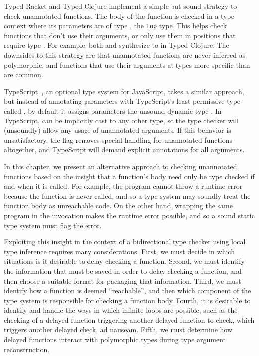 Typed Racket and Typed Clojure implement a simple but sound strategy
to check unannotated functions. The body of the function is checked
in a type context where its parameters are of type ,
the \texttt{Top} type.
This helps check functions that don't use their arguments, or only
use them in positions that require type .
For example, both  and  
synthesize to  in Typed Clojure.
The downsides to this strategy are that unannotated functions are never
inferred as polymorphic, and functions that use their arguments
at types more specific than  are common.

TypeScript~\cite{typescript}, an optional type system for JavaScript,
takes a similar approach, but instead of annotating parameters with
TypeScript's least permissive type called ,
by default it assigns parameters the unsound dynamic type .
In TypeScript,  can be implicitly cast to any other type,
so the type checker will (unsoundly) allow any usage of unannotated arguments.
If this behavior is unsatisfactory,
the  flag removes special handling for unannotated
functions altogether, and TypeScript will demand explicit annotations for all arguments.

In this chapter, we present an alternative approach to checking unannotated functions
based on the insight that a function's body need only be type checked if and when it is called.
For example, the program  cannot throw a runtime error because
the function is never called, and so a type system may soundly treat the function body as unreachable code.
On the other hand, wrapping the same program in the invocation
makes the runtime error possible, and so a sound static type system must flag the error.

Exploiting this insight in the context of a bidirectional type checker using
local type inference requires many considerations.
First, we must decide in which situations is it desirable to delay checking a function.
Second, we must identify the information that must be saved in order to delay checking a function,
and then choose a suitable format for packaging that information.
Third, we must identify how a function is deemed ``reachable'',
and then which component of the type system is responsible for checking a function body.
Fourth, it is desirable to identify and handle the ways in which 
infinite loops are possible, such as the checking of a delayed function triggering
another delayed function to check, which triggers another delayed check, ad nauseam.
Fifth, we must determine how delayed functions interact with polymorphic types
during type argument reconstruction.


